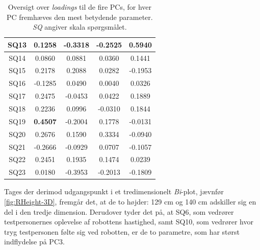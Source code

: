 \begin{table}[H]
\begin{tabular}{c|c|c|c|c}
SQ13 & 0.1258          & -0.3318         & -0.2525         & \textbf{0.5940} \\ \hline
SQ14 & 0.0860          & 0.0881          & 0.0360          & 0.1441          \\ \hline
SQ15 & 0.2178          & 0.2088          & 0.0282          & -0.1953         \\ \hline
SQ16 & -0.1285         & 0.0490          & 0.0040          & 0.0326          \\ \hline
SQ17 & 0.2475          & -0.0453         & 0.0422          & 0.1889          \\ \hline
SQ18 & 0.2236          & 0.0996          & -0.0310         & 0.1844          \\ \hline
SQ19 & \textbf{0.4507} & -0.2004         & 0.1778          & -0.0131         \\ \hline
SQ20 & 0.2676          & 0.1590          & 0.3334          & -0.0940         \\ \hline
SQ21 & -0.2666         & -0.0929         & 0.0707          & -0.1057         \\ \hline
SQ22 & 0.2451          & 0.1935          & 0.1474          & 0.0239          \\ \hline
SQ23 & 0.0180           & -0.3953        & -0.2013         & -0.1809        
\end{tabular}
\caption{Oversigt over \textit{loadings} til de fire PCs, for hver PC fremhæves den mest betydende parameter. \textit{SQ} angiver skala spørgsmålet.}
\label{tab:LoadingsHoejde}
\end{table}
\noindent
%
Tages der derimod udgangspunkt i et tredimensionelt \textit{Bi}-plot, jævnfør \autoref{fig:RHeight-3D}, fremgår det, at de to højder: 129 cm og 140 cm adskiller sig en del i den tredje dimension. Derudover tyder det på, at SQ6, som vedrører testpersonernes oplevelse af robottens hastighed, samt SQ10, som vedrører hvor tryg testpersonen følte sig ved robotten, er de to parametre, som har størst indflydelse på PC3. 

